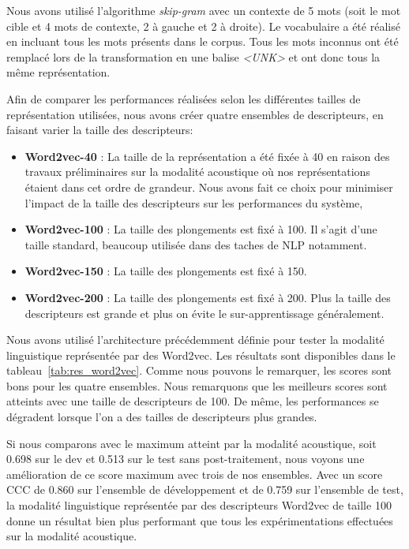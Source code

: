 

Nous avons utilisé l'algorithme \textit{skip-gram} avec un contexte de 5 mots (soit le mot cible et 4 mots de contexte, 2 à gauche et 2 à droite). Le vocabulaire a été réalisé en incluant tous les mots présents dans le corpus. Tous les mots inconnus ont été remplacé lors de la transformation en une balise \textit{<UNK>} et ont donc tous la même représentation.

Afin de comparer les performances réalisées selon les différentes tailles de représentation utilisées, nous avons créer quatre ensembles de descripteurs, en faisant varier la taille des descripteurs:
\begin{itemize}
  \item \textbf{Word2vec-40} : La taille de la représentation a été fixée à 40 en raison des travaux préliminaires sur la modalité acoustique où nos représentations étaient dans cet ordre de grandeur. Nous avons fait ce choix pour minimiser l'impact de la taille des descripteurs sur les performances du système,
  \item \textbf{Word2vec-100} : La taille des plongements est fixé à 100. Il s'agit d'une taille standard, beaucoup utilisée dans des taches de NLP notamment.
  \item \textbf{Word2vec-150} : La taille des plongements est fixé à 150.
  \item \textbf{Word2vec-200} : La taille des plongements est fixé à 200. Plus la taille des descripteurs est grande et plus on évite le sur-apprentissage généralement.
\end{itemize}

Nous avons utilisé l'architecture précédemment définie pour tester la modalité linguistique représentée par des Word2vec. Les résultats sont disponibles dans le tableau~\ref{tab:res_word2vec}. Comme nous pouvons le remarquer, les scores sont bons pour les quatre ensembles. Nous remarquons que les meilleurs scores sont atteints avec une taille de descripteurs de 100. De même, les performances se dégradent lorsque l'on a des tailles de descripteurs plus grandes.

Si nous comparons avec le maximum atteint par la modalité acoustique, soit 0.698 sur le dev et 0.513 sur le test sans post-traitement, nous voyons une amélioration de ce score maximum avec trois de nos ensembles. Avec un score CCC de 0.860 sur l'ensemble de développement et de 0.759 sur l'ensemble de test, la modalité linguistique représentée par des descripteurs Word2vec de taille 100 donne un résultat bien plus performant que tous les expérimentations effectuées sur la modalité acoustique.

